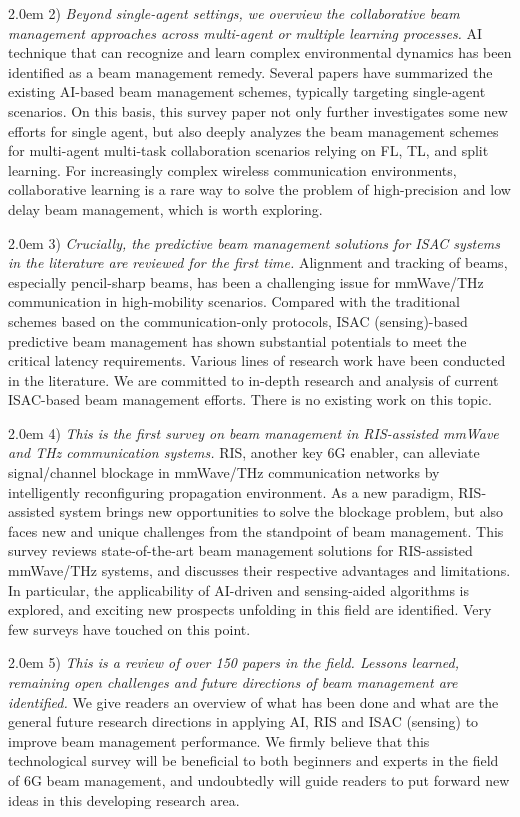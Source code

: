\documentclass[journal,comsoc]{IEEEtran}
\begin{document}
\hangindent 2.0em
2) \emph{Beyond single-agent settings, we overview the collaborative beam management approaches across multi-agent or multiple learning processes.} AI technique that can recognize and learn complex environmental dynamics has been identified as a beam management remedy. Several papers have summarized the existing AI-based beam management schemes, typically targeting single-agent scenarios. On this basis, this survey paper not only further investigates some new  efforts for single agent, but also deeply analyzes the beam management schemes for multi-agent multi-task collaboration scenarios relying on FL, TL, and split learning. For increasingly complex wireless communication environments, collaborative learning is a rare way to solve the problem of high-precision and low delay beam management, which is worth exploring.


\hangindent 2.0em
3) \emph{Crucially, the predictive beam management solutions for ISAC systems in the literature are reviewed for the first time.} Alignment and tracking of beams, especially pencil-sharp beams, has been a challenging issue for mmWave/THz communication in high-mobility scenarios. Compared with the traditional schemes based on the communication-only protocols, ISAC (sensing)-based predictive beam management has shown substantial potentials to meet the critical latency requirements. Various lines of research work have been conducted in the literature. We are committed to in-depth research and analysis of current ISAC-based beam management efforts. There is no existing work on this topic.


\hangindent 2.0em
4) \emph{This is the first survey on beam management in RIS-assisted mmWave and THz communication systems.} RIS, another key 6G enabler, can alleviate signal/channel blockage in mmWave/THz communication networks by intelligently reconfiguring propagation environment. As a new paradigm, RIS-assisted system brings new opportunities to solve the blockage problem, but also faces new and unique challenges from the standpoint of beam management. This survey reviews state-of-the-art beam management solutions for RIS-assisted mmWave/THz systems, and discusses their respective advantages and limitations. In particular, the applicability of AI-driven and sensing-aided algorithms is explored, and exciting new prospects unfolding in this field are identified. Very few surveys have touched on this point.



\hangindent 2.0em
5) \emph{This is a review of over 150 papers in the field. Lessons learned, remaining open challenges and future
	directions of beam management are identified.} We give readers an overview of what has been done and what are the general future research directions in applying AI, RIS and ISAC (sensing) to improve beam management performance. We firmly believe that this technological survey will be beneficial to both beginners and experts in the field of 6G beam management, and undoubtedly will guide readers to put forward new ideas in this developing research area.
\end{document}
